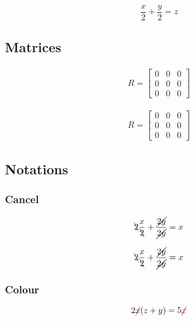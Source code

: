\begin{equation}
    \frac{x}{2}+\frac{y}{2}=z
\end{equation}

\subsection{Matrices}

\begin{TeXlstlisting}
\begin{gather*}
    R = \begin{bmatrix}
        0& 0& 0 \\
        0& 0& 0 \\
        0& 0& 0
    \end{bmatrix}
\end{gather*}
\end{TeXlstlisting}

\begin{gather*}
    R = \begin{bmatrix}
        0& 0& 0 \\
        0& 0& 0 \\
        0& 0& 0
    \end{bmatrix}
\end{gather*}

\subsection{Notations}

\subsubsection{Cancel}

\begin{TeXlstlisting}
\begin{equation*}
    \bcancel{2}\frac{x}{\bcancel{2}}+\frac{\cancel{2y}}{\cancel{2y}}=x
\end{equation*}
\end{TeXlstlisting}

\begin{equation*}
    \bcancel{2}\frac{x}{\bcancel{2}}+\frac{\cancel{2y}}{\cancel{2y}}=x
\end{equation*}

\subsubsection{Colour}

\begin{TeXlstlisting}
\begin{equation*}
    2\textcolor{red}{\cancel{\textcolor{black}{x}}} (z+y) 
    = 5\cancel{\textcolor{red}{x}}
\end{equation*}
\end{TeXlstlisting}

